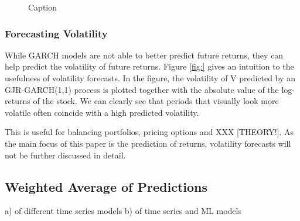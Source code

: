 \begin{figure}
    \centering
    \caption{Caption}
    \label{fig:V_INTC_ARMA_predictions_plot}
\end{figure}{}


\subsubsection{Forecasting Volatility}
While GARCH models are not able to better predict future returns, they can help predict the volatility of future returns. Figure \ref{fig:} gives an intuition to the usefulness of volatility forecasts. In the figure, the volatility of V predicted by an GJR-GARCH(1,1) process is plotted together with the absolute value of the log-returns of the stock. We can clearly see that periods that visually look more volatile often coincide with a high predicted volatility. 

This is useful for balancing portfolios, pricing options and XXX [THEORY!]. As the main focus of this paper is the prediction of returns, volatility forecasts will not be further discussed in detail. 




\subsection{Weighted Average of Predictions}
a) of different time series models
b) of time series and ML models






